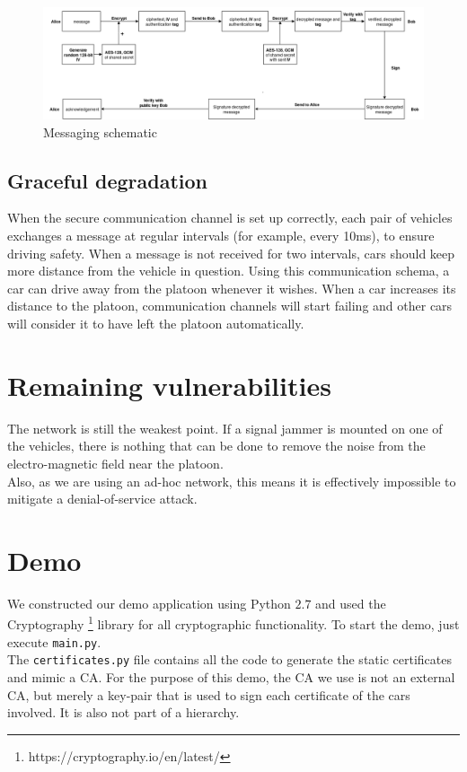 \documentclass[a4paper, 11pt]{article}
\begin{document}
\begin{figure}
\includegraphics[scale=0.5]{imgs/IS_Demo_MSG}
\caption{Messaging schematic}
\end{figure}

\subsection{Graceful degradation}
When the secure communication channel is set up correctly, each pair of vehicles exchanges a message
at regular intervals (for example, every 10ms), to ensure driving safety. When a message is not received for two
intervals, cars should keep more distance from the vehicle in question.
Using this communication schema, a car can drive away from the platoon whenever it wishes.
When a car increases its distance to the platoon, communication channels will start failing and other cars will consider it to have left the platoon automatically.


\section{Remaining vulnerabilities}
The network is still the weakest point. If a signal jammer is mounted
on one of the vehicles, there is nothing that can be done to remove the
noise from the electro-magnetic field near the platoon. \\

Also, as we are using an ad-hoc network, this means it is effectively impossible to mitigate a denial-of-service
attack.

\section{Demo}
We constructed our demo application using Python $2.7$ and used the Cryptography
\footnote{https://cryptography.io/en/latest/} library for all cryptographic
functionality. To start the demo, just execute \texttt{main.py}.\\

The \texttt{certificates.py} file contains all the code to generate the static
certificates and mimic a CA. For the purpose of this demo, the CA we use is not
an external CA, but merely a key-pair that is used to sign each certificate of
the cars involved. It is also not part of a hierarchy.\\
\end{document}
